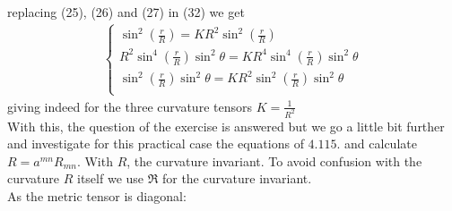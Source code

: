 replacing (25), (26) and (27) in (32) we get
 \begin{align}
\left\{\begin{array}{l}
\sin^2\left(\frac{r}{R}\right)= K R^2\sin^2\left(\frac{r}{R}\right)\\
R^2\sin^4\left(\frac{r}{R}\right)\sin^2\theta= K R^4\sin^4\left(\frac{r}{R}\right)\sin^2\theta\\
\sin^2\left(\frac{r}{R}\right)\sin^2\theta= K R^2\sin^2\left(\frac{r}{R}\right)\sin^2\theta\\
\end{array}\right.
\end{align}
giving indeed for the three curvature tensors $K=\frac{1}{R^2}$\\
With this, the question of the  exercise is answered but we go a little bit further and investigate for this practical case the equations of $\mathbf{4.115.}$ and  calculate $R=a^{mn}R_{mn}$. With $R$, the curvature invariant. To avoid confusion with the curvature $R$ itself we use $\mathfrak{R}$ for the curvature invariant.\\
As the metric tensor is diagonal:


